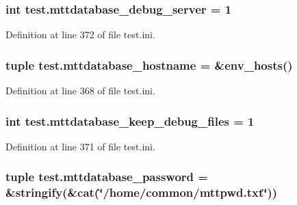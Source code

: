 \hypertarget{namespacetest_a3ac6ed984e10925873b601b7c08e0a17}{
\subsubsection[{mttdatabase\-\_\-debug\-\_\-server}]{\setlength{\rightskip}{0pt plus 5cm}int test.\-mttdatabase\-\_\-debug\-\_\-server = 1}}\label{namespacetest_a3ac6ed984e10925873b601b7c08e0a17}


Definition at line 372 of file test.\-ini.

\hypertarget{namespacetest_ade0bfe5e5627318e781e4d494c889bd3}{
\subsubsection[{mttdatabase\-\_\-hostname}]{\setlength{\rightskip}{0pt plus 5cm}tuple test.\-mttdatabase\-\_\-hostname = \&env\-\_\-hosts()}}\label{namespacetest_ade0bfe5e5627318e781e4d494c889bd3}


Definition at line 368 of file test.\-ini.

\hypertarget{namespacetest_a9a41a6defd3632956b1fe345985788f6}{
\subsubsection[{mttdatabase\-\_\-keep\-\_\-debug\-\_\-files}]{\setlength{\rightskip}{0pt plus 5cm}int test.\-mttdatabase\-\_\-keep\-\_\-debug\-\_\-files = 1}}\label{namespacetest_a9a41a6defd3632956b1fe345985788f6}


Definition at line 371 of file test.\-ini.

\hypertarget{namespacetest_a51e535ad16f2253bc9fa6509c258a110}{
\subsubsection[{mttdatabase\-\_\-password}]{\setlength{\rightskip}{0pt plus 5cm}tuple test.\-mttdatabase\-\_\-password = \&stringify(\&cat(\char`\"{}/home/common/mttpwd.\-txt\char`\"{}))}}\label{namespacetest_a51e535ad16f2253bc9fa6509c258a110}


